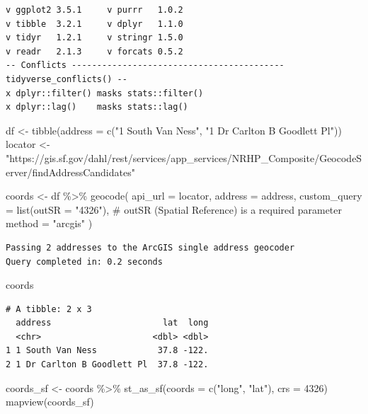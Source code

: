 \documentclass[
  letterpaper,
  DIV=11,
  numbers=noendperiod]{scrreprt}
\newenvironment{Shaded}{\begin{snugshade}}{\end{snugshade}}
\newcommand{\AttributeTok}[1]{\textcolor[rgb]{0.40,0.45,0.13}{#1}}
\newcommand{\CommentTok}[1]{\textcolor[rgb]{0.37,0.37,0.37}{#1}}
\newcommand{\DecValTok}[1]{\textcolor[rgb]{0.68,0.00,0.00}{#1}}
\newcommand{\FunctionTok}[1]{\textcolor[rgb]{0.28,0.35,0.67}{#1}}
\newcommand{\NormalTok}[1]{\textcolor[rgb]{0.00,0.23,0.31}{#1}}
\newcommand{\OtherTok}[1]{\textcolor[rgb]{0.00,0.23,0.31}{#1}}
\newcommand{\SpecialCharTok}[1]{\textcolor[rgb]{0.37,0.37,0.37}{#1}}
\newcommand{\StringTok}[1]{\textcolor[rgb]{0.13,0.47,0.30}{#1}}
\begin{document}
\begin{verbatim}
v ggplot2 3.5.1     v purrr   1.0.2
v tibble  3.2.1     v dplyr   1.1.0
v tidyr   1.2.1     v stringr 1.5.0
v readr   2.1.3     v forcats 0.5.2
-- Conflicts ------------------------------------------ tidyverse_conflicts() --
x dplyr::filter() masks stats::filter()
x dplyr::lag()    masks stats::lag()
\end{verbatim}

\begin{Shaded}
\begin{Highlighting}[]
\NormalTok{df }\OtherTok{\textless{}{-}} \FunctionTok{tibble}\NormalTok{(}\AttributeTok{address =} \FunctionTok{c}\NormalTok{(}\StringTok{"1 South Van Ness"}\NormalTok{, }\StringTok{"1 Dr Carlton B Goodlett Pl"}\NormalTok{))}
\NormalTok{locator }\OtherTok{\textless{}{-}} \StringTok{"https://gis.sf.gov/dahl/rest/services/app\_services/NRHP\_Composite/GeocodeServer/findAddressCandidates"}

\NormalTok{coords }\OtherTok{\textless{}{-}}\NormalTok{ df }\SpecialCharTok{\%\textgreater{}\%} 
  \FunctionTok{geocode}\NormalTok{(}
    \AttributeTok{api\_url =}\NormalTok{ locator,}
    \AttributeTok{address =}\NormalTok{ address,}
    \AttributeTok{custom\_query =} \FunctionTok{list}\NormalTok{(}\AttributeTok{outSR =} \StringTok{"4326"}\NormalTok{), }\CommentTok{\# outSR (Spatial Reference) is a required parameter}
    \AttributeTok{method =} \StringTok{"arcgis"}
\NormalTok{  )}
\end{Highlighting}
\end{Shaded}

\begin{verbatim}
Passing 2 addresses to the ArcGIS single address geocoder
Query completed in: 0.2 seconds
\end{verbatim}

\begin{Shaded}
\begin{Highlighting}[]
\NormalTok{coords}
\end{Highlighting}
\end{Shaded}

\begin{verbatim}
# A tibble: 2 x 3
  address                      lat  long
  <chr>                      <dbl> <dbl>
1 1 South Van Ness            37.8 -122.
2 1 Dr Carlton B Goodlett Pl  37.8 -122.
\end{verbatim}

\begin{Shaded}
\begin{Highlighting}[]
\NormalTok{coords\_sf }\OtherTok{\textless{}{-}}\NormalTok{ coords }\SpecialCharTok{\%\textgreater{}\%} \FunctionTok{st\_as\_sf}\NormalTok{(}\AttributeTok{coords =} \FunctionTok{c}\NormalTok{(}\StringTok{"long"}\NormalTok{, }\StringTok{"lat"}\NormalTok{), }\AttributeTok{crs =} \DecValTok{4326}\NormalTok{)}
\FunctionTok{mapview}\NormalTok{(coords\_sf)}
\end{Highlighting}
\end{Shaded}
\end{document}
